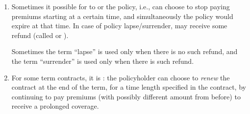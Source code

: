 \begin{enumerate}
\item Sometimes it possible for  to  or
 the policy, i.e.,  can choose to stop paying
premiums starting at a certain time, and simultaneously the policy would expire
at that time.  In case of policy lapse/surrender,  may receive
some refund (called  or ).

\begin{note}
Sometimes the term ``lapse'' is used only when there is no such refund, and the
term ``surrender'' is used only when there is such refund.
\end{note}

\item For some term contracts, it is : the policyholder
 can choose to \emph{renew} the contract at the end of the term,
for a time length specified in the contract, by continuing to pay premiums
(with possibly different amount from before) to receive a prolonged coverage.
\end{enumerate}
